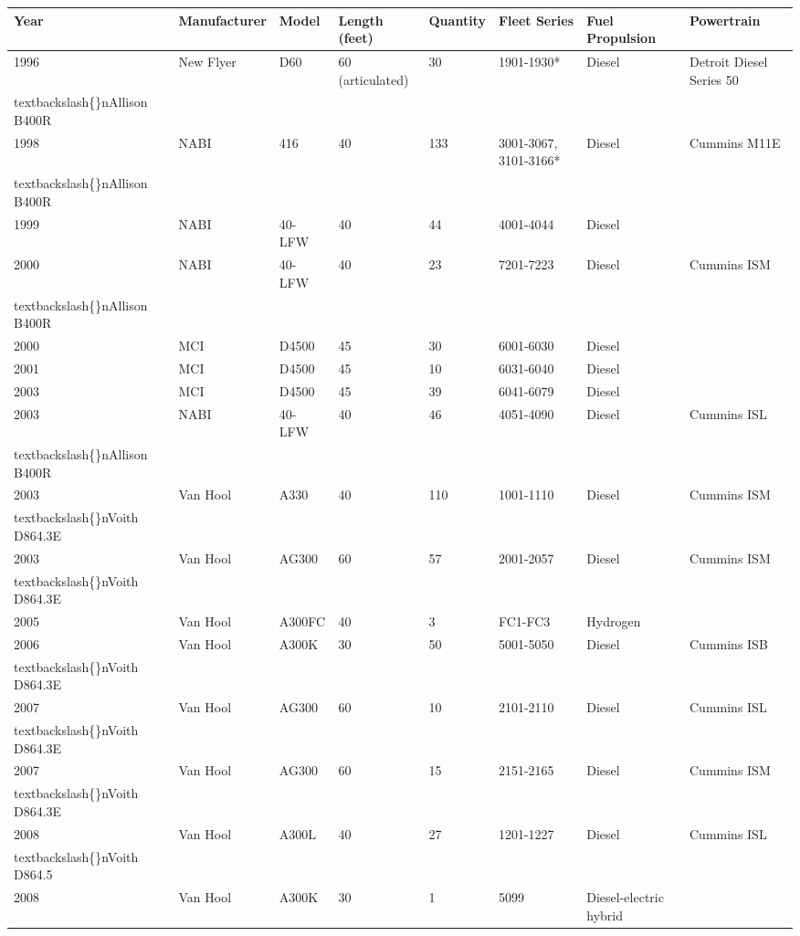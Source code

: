 \documentclass{article}
\begin{document}
\begin{tabular}{llllllll}
\toprule
Year & Manufacturer & Model & Length (feet) & Quantity & Fleet Series & Fuel Propulsion & Powertrain \\
\midrule
1996 & New Flyer & D60 & 60 (articulated) & 30 & 1901-1930* & Diesel & Detroit Diesel Series 50\\textbackslash\{\}nAllison B400R \\
1998 & NABI & 416 & 40 & 133 & 3001-3067, 3101-3166* & Diesel & Cummins M11E\\textbackslash\{\}nAllison B400R \\
1999 & NABI & 40-LFW & 40 & 44 & 4001-4044 & Diesel &  \\
2000 & NABI & 40-LFW & 40 & 23 & 7201-7223 & Diesel & Cummins ISM\\textbackslash\{\}nAllison B400R \\
2000 & MCI & D4500 & 45 & 30 & 6001-6030 & Diesel &  \\
2001 & MCI & D4500 & 45 & 10 & 6031-6040 & Diesel &  \\
2003 & MCI & D4500 & 45 & 39 & 6041-6079 & Diesel &  \\
2003 & NABI & 40-LFW & 40 & 46 & 4051-4090 & Diesel & Cummins ISL\\textbackslash\{\}nAllison B400R \\
2003 & Van Hool & A330 & 40 & 110 & 1001-1110 & Diesel & Cummins ISM\\textbackslash\{\}nVoith D864.3E \\
2003 & Van Hool & AG300 & 60 & 57 & 2001-2057 & Diesel & Cummins ISM\\textbackslash\{\}nVoith D864.3E \\
2005 & Van Hool & A300FC & 40 & 3 & FC1-FC3 & Hydrogen &  \\
2006 & Van Hool & A300K & 30 & 50 & 5001-5050 & Diesel & Cummins ISB\\textbackslash\{\}nVoith D864.3E \\
2007 & Van Hool & AG300 & 60 & 10 & 2101-2110 & Diesel & Cummins ISL\\textbackslash\{\}nVoith D864.3E \\
2007 & Van Hool & AG300 & 60 & 15 & 2151-2165 & Diesel & Cummins ISM\\textbackslash\{\}nVoith D864.3E \\
2008 & Van Hool & A300L & 40 & 27 & 1201-1227 & Diesel & Cummins ISL\\textbackslash\{\}nVoith D864.5 \\
2008 & Van Hool & A300K & 30 & 1 & 5099 & Diesel-electric hybrid &  \\

\end{tabular}
\end{document}
